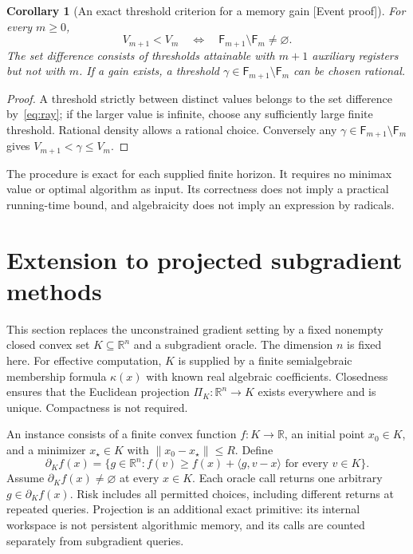 \documentclass[11pt]{article}
\newcommand{\supportlabel}[1]{\textcolor{blue!60!black}{\small\textsf{[#1]}}}
\newcommand{\eventproof}{\supportlabel{Event proof}}
\numberwithin{equation}{section}
\newtheorem{corollary}[theorem]{Corollary}
\theoremstyle{definition}
\newcommand{\R}{\mathbb R}
\begin{document}
\begin{corollary}[An exact threshold criterion for a memory gain \eventproof]\label{cor:gain}
For every $m\ge0$,
\begin{equation}
 V_{m+1}<V_m
 \quad\Longleftrightarrow\quad
 \mathsf F_{m+1}\setminus \mathsf F_m\ne\varnothing.
 \label{eq:gain}
\end{equation}
The set difference consists of thresholds attainable with $m+1$ auxiliary registers but not with $m$. If a gain exists, a threshold $\gamma\in \mathsf F_{m+1}\setminus \mathsf F_m$ can be chosen rational.
\end{corollary}
\begin{proof}
A threshold strictly between distinct values belongs to the set difference by~\eqref{eq:ray}; if the larger value is infinite, choose any sufficiently large finite threshold. Rational density allows a rational choice. Conversely any $\gamma\in \mathsf F_{m+1}\setminus \mathsf F_m$ gives $V_{m+1}<\gamma\le V_m$.
\end{proof}

The procedure is exact for each supplied finite horizon. It requires no minimax value or optimal algorithm as input. Its correctness does not imply a practical running-time bound, and algebraicity does not imply an expression by radicals.

\section{Extension to projected subgradient methods}
\label{sec:projected}
This section replaces the unconstrained gradient setting by a fixed nonempty closed convex set $K\subseteq\R^n$ and a subgradient oracle. The dimension $n$ is fixed here. For effective computation, $K$ is supplied by a finite semialgebraic membership formula $\kappa(x)$ with known real algebraic coefficients. Closedness ensures that the Euclidean projection $\Pi_K:\R^n\to K$ exists everywhere and is unique. Compactness is not required.

An instance consists of a finite convex function $f:K\to\R$, an initial point $x_0\in K$, and a minimizer $x_\star\in K$ with $\|x_0-x_\star\|\le R$. Define
\[
 \partial_K f(x)=\{g\in\R^n:
 f(v)\ge f(x)+\langle g,v-x\rangle\text{ for every }v\in K\}.
\]
Assume $\partial_K f(x)\ne\varnothing$ at every $x\in K$. Each oracle call returns one arbitrary $g\in\partial_K f(x)$. Risk includes all permitted choices, including different returns at repeated queries. Projection is an additional exact primitive: its internal workspace is not persistent algorithmic memory, and its calls are counted separately from subgradient queries.
\end{document}
